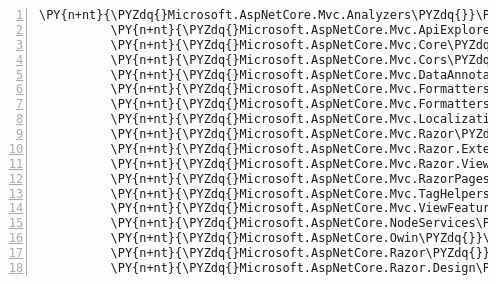 \begin{Verbatim}[commandchars=\\\{\},numbers=left,firstnumber=1,stepnumber=1,numberblanklines=0]
          \PY{n+nt}{\PYZdq{}Microsoft.AspNetCore.Mvc.Analyzers\PYZdq{}}\PY{p}{:} \PY{l+s+s2}{\PYZdq{}2.1.0\PYZhy{}rc1\PYZhy{}final\PYZdq{}}\PY{p}{,}
          \PY{n+nt}{\PYZdq{}Microsoft.AspNetCore.Mvc.ApiExplorer\PYZdq{}}\PY{p}{:} \PY{l+s+s2}{\PYZdq{}2.1.0\PYZhy{}rc1\PYZhy{}final\PYZdq{}}\PY{p}{,}
          \PY{n+nt}{\PYZdq{}Microsoft.AspNetCore.Mvc.Core\PYZdq{}}\PY{p}{:} \PY{l+s+s2}{\PYZdq{}2.1.0\PYZhy{}rc1\PYZhy{}final\PYZdq{}}\PY{p}{,}
          \PY{n+nt}{\PYZdq{}Microsoft.AspNetCore.Mvc.Cors\PYZdq{}}\PY{p}{:} \PY{l+s+s2}{\PYZdq{}2.1.0\PYZhy{}rc1\PYZhy{}final\PYZdq{}}\PY{p}{,}
          \PY{n+nt}{\PYZdq{}Microsoft.AspNetCore.Mvc.DataAnnotations\PYZdq{}}\PY{p}{:} \PY{l+s+s2}{\PYZdq{}2.1.0\PYZhy{}rc1\PYZhy{}final\PYZdq{}}\PY{p}{,}
          \PY{n+nt}{\PYZdq{}Microsoft.AspNetCore.Mvc.Formatters.Json\PYZdq{}}\PY{p}{:} \PY{l+s+s2}{\PYZdq{}2.1.0\PYZhy{}rc1\PYZhy{}final\PYZdq{}}\PY{p}{,}
          \PY{n+nt}{\PYZdq{}Microsoft.AspNetCore.Mvc.Formatters.Xml\PYZdq{}}\PY{p}{:} \PY{l+s+s2}{\PYZdq{}2.1.0\PYZhy{}rc1\PYZhy{}final\PYZdq{}}\PY{p}{,}
          \PY{n+nt}{\PYZdq{}Microsoft.AspNetCore.Mvc.Localization\PYZdq{}}\PY{p}{:} \PY{l+s+s2}{\PYZdq{}2.1.0\PYZhy{}rc1\PYZhy{}final\PYZdq{}}\PY{p}{,}
          \PY{n+nt}{\PYZdq{}Microsoft.AspNetCore.Mvc.Razor\PYZdq{}}\PY{p}{:} \PY{l+s+s2}{\PYZdq{}2.1.0\PYZhy{}rc1\PYZhy{}final\PYZdq{}}\PY{p}{,}
          \PY{n+nt}{\PYZdq{}Microsoft.AspNetCore.Mvc.Razor.Extensions\PYZdq{}}\PY{p}{:} \PY{l+s+s2}{\PYZdq{}2.1.0\PYZhy{}rc1\PYZhy{}final\PYZdq{}}\PY{p}{,}
          \PY{n+nt}{\PYZdq{}Microsoft.AspNetCore.Mvc.Razor.ViewCompilation\PYZdq{}}\PY{p}{:} \PY{l+s+s2}{\PYZdq{}2.1.0\PYZhy{}rc1\PYZhy{}final\PYZdq{}}\PY{p}{,}
          \PY{n+nt}{\PYZdq{}Microsoft.AspNetCore.Mvc.RazorPages\PYZdq{}}\PY{p}{:} \PY{l+s+s2}{\PYZdq{}2.1.0\PYZhy{}rc1\PYZhy{}final\PYZdq{}}\PY{p}{,}
          \PY{n+nt}{\PYZdq{}Microsoft.AspNetCore.Mvc.TagHelpers\PYZdq{}}\PY{p}{:} \PY{l+s+s2}{\PYZdq{}2.1.0\PYZhy{}rc1\PYZhy{}final\PYZdq{}}\PY{p}{,}
          \PY{n+nt}{\PYZdq{}Microsoft.AspNetCore.Mvc.ViewFeatures\PYZdq{}}\PY{p}{:} \PY{l+s+s2}{\PYZdq{}2.1.0\PYZhy{}rc1\PYZhy{}final\PYZdq{}}\PY{p}{,}
          \PY{n+nt}{\PYZdq{}Microsoft.AspNetCore.NodeServices\PYZdq{}}\PY{p}{:} \PY{l+s+s2}{\PYZdq{}2.1.0\PYZhy{}rc1\PYZhy{}final\PYZdq{}}\PY{p}{,}
          \PY{n+nt}{\PYZdq{}Microsoft.AspNetCore.Owin\PYZdq{}}\PY{p}{:} \PY{l+s+s2}{\PYZdq{}2.1.0\PYZhy{}rc1\PYZhy{}final\PYZdq{}}\PY{p}{,}
          \PY{n+nt}{\PYZdq{}Microsoft.AspNetCore.Razor\PYZdq{}}\PY{p}{:} \PY{l+s+s2}{\PYZdq{}2.1.0\PYZhy{}rc1\PYZhy{}final\PYZdq{}}\PY{p}{,}
          \PY{n+nt}{\PYZdq{}Microsoft.AspNetCore.Razor.Design\PYZdq{}}\PY{p}{:} \PY{l+s+s2}{\PYZdq{}2.1.0\PYZhy{}rc1\PYZhy{}final\PYZdq{}}\PY{p}{,}

\end{Verbatim}
